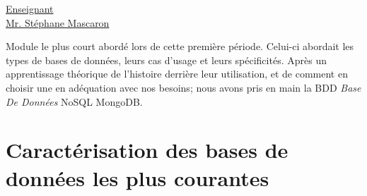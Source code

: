 \renewcommand{\figurename}{}
\renewcommand{\tablename}{}

\vspace*{0.2cm}
      \large
      \href{\@orientadorPagina}{\color{black}Enseignant\\Mr. Stéphane Mascaron}\\
\vspace*{0.5cm}

Module le plus court abordé lors de cette première période. Celui-ci abordait les types de bases de données, leurs cas d'usage et leurs spécificités. Après un apprentissage théorique de l'histoire derrière leur utilisation, et de comment en choisir une en adéquation avec nos besoins; nous avons pris en main la BDD \textit{Base De Données} NoSQL MongoDB.

\section{Caractérisation des bases de données les plus courantes}

